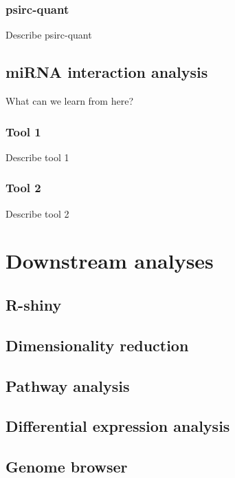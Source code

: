 \subsubsection{psirc-quant}
Describe psirc-quant

\subsection{miRNA interaction analysis}
What can we learn from here?

\subsubsection{Tool 1}
Describe tool 1

\subsubsection{Tool 2}
Describe tool 2

\section{Downstream analyses}
\subsection{R-shiny}
\subsection{Dimensionality reduction}
\subsection{Pathway analysis}
\subsection{Differential expression analysis}
\subsection{Genome browser}
